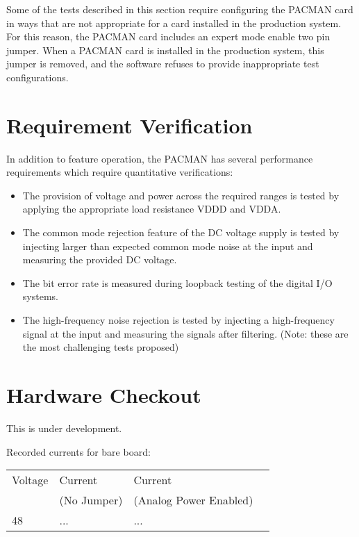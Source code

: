 \documentclass[12pt]{article}
\begin{document}
Some of the tests described in this section require configuring the
PACMAN card in ways that are not appropriate for a card installed in
the production system.  For this reason, the PACMAN card includes an
expert mode enable two pin jumper.  When a PACMAN card is installed in
the production system, this jumper is removed, and the software
refuses to provide inappropriate test configurations.

\section{Requirement Verification}

In addition to feature operation, the PACMAN has several performance requirements which require quantitative verifications:

\begin{itemize}
 \item The provision of voltage and power across the required ranges
   is tested by applying the appropriate load resistance VDDD and VDDA.
 \item The common mode rejection feature of the DC voltage supply is
   tested by injecting larger than expected common mode noise at the
   input and measuring the provided DC voltage.
 \item The bit error rate is measured during loopback testing of the digital I/O systems.  
 \item The high-frequency noise rejection is tested by injecting a
   high-frequency signal at the input and measuring the signals after
   filtering. (Note: these are the most challenging tests proposed)
\end{itemize}

\section{Hardware Checkout}

This is under development.

Recorded currents for bare board:
\begin{center}
\begin{tabular}{|l|l|l|l|}
\hline
Voltage & Current    &  Current \\
        & (No Jumper) & (Analog Power Enabled) \\
48      & ...         & ... \\
\end{tabular}
\end{center}
\end{document}
